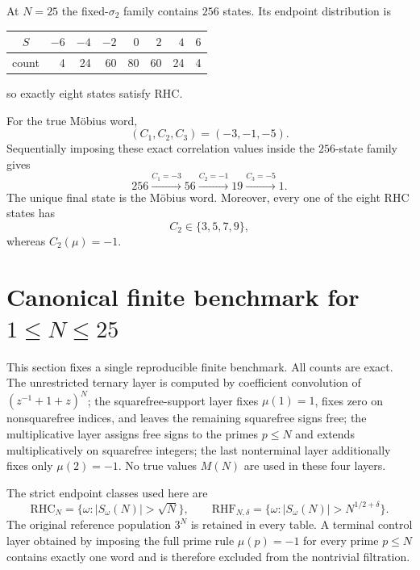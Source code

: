 \documentclass[11pt]{article}
\newcommand{\RHC}{\mathrm{RHC}}
\newcommand{\RHF}{\mathrm{RHF}}
\begin{document}
At $N=25$ the fixed-$\sigma_2$ family contains $256$ states.  Its endpoint distribution is
\begin{center}
\begin{tabular}{c|rrrrrrr}
$S$&$-6$&$-4$&$-2$&$0$&$2$&$4$&$6$\\
\hline
count&4&24&60&80&60&24&4
\end{tabular}
\end{center}
so exactly eight states satisfy RHC.

For the true M\"obius word,
\[
 \boxed{(C_1,C_2,C_3)=(-3,-1,-5).}
\]
Sequentially imposing these exact correlation values inside the $256$-state family gives
\[
 \boxed{
 256\xrightarrow{C_1=-3}56
 \xrightarrow{C_2=-1}19
 \xrightarrow{C_3=-5}1.
 }
\]
The unique final state is the M\"obius word.  Moreover, every one of the eight RHC states has
\[
 C_2\in\{3,5,7,9\},
\]
whereas $C_2(\mu)=-1$.

\section{Canonical finite benchmark for $1\le N\le 25$}

This section fixes a single reproducible finite benchmark. All counts are exact. The unrestricted ternary layer is computed by coefficient convolution of $(z^{-1}+1+z)^N$; the squarefree-support layer fixes $\mu(1)=1$, fixes zero on nonsquarefree indices, and leaves the remaining squarefree signs free; the multiplicative layer assigns free signs to the primes $p\le N$ and extends multiplicatively on squarefree integers; the last nonterminal layer additionally fixes only $\mu(2)=-1$. No true values $M(N)$ are used in these four layers.

The strict endpoint classes used here are
\[
 \RHC_N=\{\omega:|S_\omega(N)|>\sqrt N\},
 \qquad
 \RHF_{N,\delta}=\{\omega:|S_\omega(N)|>N^{1/2+\delta}\}.
\]
The original reference population $3^N$ is retained in every table. A terminal control layer obtained by imposing the full prime rule $\mu(p)=-1$ for every prime $p\le N$ contains exactly one word and is therefore excluded from the nontrivial filtration.
\end{document}
